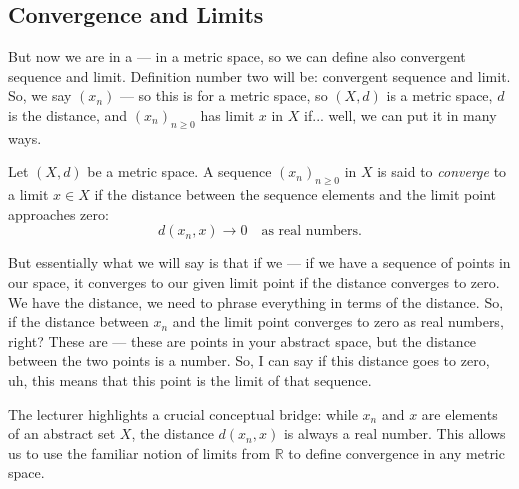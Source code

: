 \subsection*{Convergence and Limits}

\begin{spoken-clean}[00:03:00 - 00:04:11]
But now we are in a — in a metric space, so we can define also convergent sequence and limit. Definition number two will be: convergent sequence and limit.  So, we say $(x_n)$ — so this is for a metric space, so $(X, d)$ is a metric space, $d$ is the distance, and $(x_n)_{n \ge 0}$ has limit $x$ in $X$ if... well, we can put it in many ways.
\end{spoken-clean}

\begin{math-stroke}
\setcounter{theorem}{17}
\begin{definition}\label{def:convergence-limit}
Let $(X, d)$ be a metric space. A sequence $(x_n)_{n \ge 0}$ in $X$ is said to \emph{converge} to a limit $x \in X$ if the distance between the sequence elements and the limit point approaches zero:
\[ d(x_n, x) \to 0 \quad \text{as real numbers}. \]
\end{definition}
\end{math-stroke}

\begin{spoken-clean}[00:04:11 - 00:05:15]
But essentially what we will say is that if we — if we have a sequence of points in our space, it converges to our given limit point if the distance converges to zero. We have the distance, we need to phrase everything in terms of the distance. So, if the distance between $x_n$ and the limit point converges to zero as real numbers, right? These are — these are points in your abstract space, but the distance between the two points is a number. So, I can say if this distance goes to zero, uh, this means that this point is the limit of that sequence.
\end{spoken-clean}

\begin{didactic-insight}
The lecturer highlights a crucial conceptual bridge: while $x_n$ and $x$ are elements of an abstract set $X$, the distance $d(x_n, x)$ is always a real number. This allows us to use the familiar notion of limits from $\mathbb{R}$ to define convergence in any metric space.
\end{didactic-insight}

